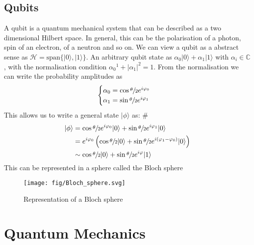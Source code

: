 \documentclass[12pt]{book}
\theoremstyle{definition}
\newcommand{\C}{\mathbb C}
\newcommand{\p}{\varphi}
\newcommand{\abs}[1]{\left\vert {#1}\right\vert}
\newcommand{\para}[1]{\left( {#1} \right)}
\newcommand{\ket}[1]{\vert {#1} \rangle}
\begin{document}
\section{Qubits}
A qubit is a quantum mechanical system that can be described as a two dimensional Hilbert space. In general, this can be the polarisation of a photon, spin of an electron, of a neutron and so on. We can view a qubit as a abstract sense as $\mathcal H = \mathrm{span}\{\ket{0}, \ket{1}\}$. An arbitrary qubit state as $\alpha_0 \ket{0} + \alpha_1 \ket{1}$ with $\alpha_i \in \C$, with the normalisation condition ${\alpha_0}^1 + \abs{\alpha_1}^2 = 1$. From the normalisation we can write the probability amplitudes as
\begin{equation}
  \begin{cases}
    \alpha_0 = \cos \sfrac \theta 2 e^{i\p_0} \\
    \alpha_1 = \sin \sfrac \theta 2 e^{i\p_1}
  \end{cases}
\end{equation}
This allows us to write a general state $\ket\phi$ as:
\#\begin{align*}
 \ket{\phi} & = \cos \sfrac\theta 2 e^{i\p_0} \ket{0} + \sin \sfrac \theta 2 e^{i\p_1} \ket{0} \\
 & = e^{i\p_0} \para{\cos \sfrac \theta 2 \ket{0} + \sin \sfrac \theta 2 e^{i(\p_1 - \p_0)} \ket{0}} \\
 & \sim \cos \sfrac \theta 2 \ket{0} + \sin \sfrac \theta 2 e^{i\p} \ket{1}
\end{align*}
This can be represented in a sphere called the Bloch sphere
\begin{figure}[h!]
	\centering
  \texttt{[image: fig/Bloch\_sphere.svg]}
  \caption{Representation of a Bloch sphere }%
\end{figure}

\chapter{Quantum Mechanics}
\end{document}
